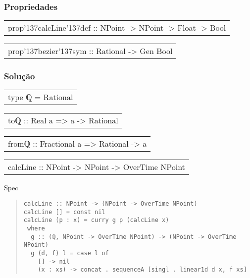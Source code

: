 \subsubsection{Propriedades}
\begin{haddockdesc}
\item[\begin{tabular}{@{}l}
prop{\char '137}calcLine{\char '137}def :: NPoint -> NPoint -> Float -> Bool
\end{tabular}]
\item[\begin{tabular}{@{}l}
prop{\char '137}bezier{\char '137}sym :: {\char 91}{\char 91}Rational{\char 93}{\char 93} -> Gen Bool
\end{tabular}]
\end{haddockdesc}
\subsubsection{Solução}
\begin{haddockdesc}
\item[\begin{tabular}{@{}l}
type ℚ = Rational
\end{tabular}]
\end{haddockdesc}
\begin{haddockdesc}
\item[\begin{tabular}{@{}l}
toℚ :: Real a => a -> Rational
\end{tabular}]
\item[\begin{tabular}{@{}l}
fromℚ :: Fractional a => Rational -> a
\end{tabular}]
\end{haddockdesc}
\begin{haddockdesc}
\item[\begin{tabular}{@{}l}
calcLine :: NPoint -> NPoint -> OverTime NPoint
\end{tabular}]
{\haddockbegindoc
Spec\par
\begin{quote}
{\haddockverb\begin{verbatim}
calcLine :: NPoint -> (NPoint -> OverTime NPoint)
calcLine [] = const nil
calcLine (p : x) = curry g p (calcLine x)
 where
  g :: (ℚ, NPoint -> OverTime NPoint) -> (NPoint -> OverTime NPoint)
  g (d, f) l = case l of
    [] -> nil
    (x : xs) -> concat . sequenceA [singl . linear1d d x, f xs]
\end{verbatim}}
\end{quote}}
\end{haddockdesc}
